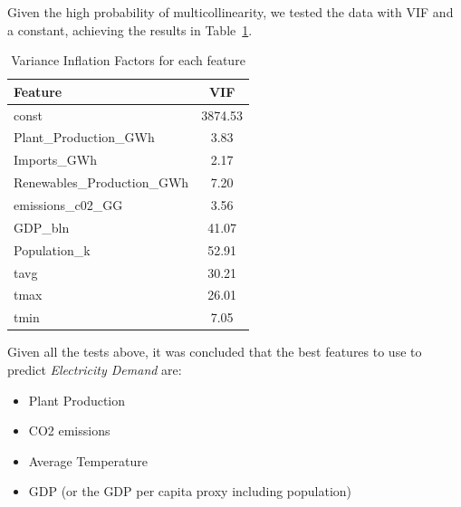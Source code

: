 \documentclass{ieeeaccess}
\begin{document}
Given the high probability of multicollinearity, we tested the data with VIF and a constant, achieving the results in Table~\ref{cointTable}.
\begin{table}[h!]

\centering
\caption{Variance Inflation Factors for each feature}
\begin{tabular}{|l|c|}
\hline
\textbf{Feature} & \textbf{VIF} \\
\hline
const & 3874.53 \\
Plant\_Production\_GWh & 3.83 \\
Imports\_GWh & 2.17 \\
Renewables\_Production\_GWh & 7.20 \\
emissions\_c02\_GG & 3.56 \\
GDP\_bln & 41.07 \\
Population\_k & 52.91 \\
tavg & 30.21 \\
tmax & 26.01 \\
tmin & 7.05 \\
\hline
\end{tabular}
\label{cointTable}
\end{table}

Given all the tests above, it was concluded that the best features to use to predict \textit{Electricity Demand} are:
\begin{itemize}
    \item Plant Production
    \item CO2 emissions
    \item Average Temperature
    \item GDP (or the GDP per capita proxy including population)
\end{itemize}
\end{document}
